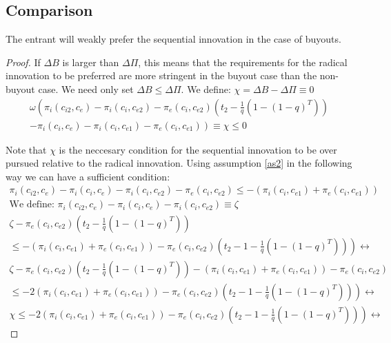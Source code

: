 \subsection{Comparison}  

\begin{proposition} \label{excessincentive}
The entrant will weakly prefer the sequential innovation in the case of buyouts.
\end{proposition}
\begin{proof}
If $\Delta B$ is larger than $\Delta \Pi$, this means that the requirements for the radical innovation to be preferred are more stringent in the buyout case than the non-buyout case.  We need only set $\Delta B \leq \Delta \Pi $. We define: $ \chi =\Delta B - \Delta \Pi \equiv 0$ 
\begin{align*}
\omega \left(  \pi_{i}(c_{i2},c_{e})- \pi_{i}(c_{i},c_{e2})-\pi_{e}(c_{i},c_{e2})  \left( t_2- \frac{1}{q} \left( 1-(1-q)^{T} \right) \right) \right. \\
-\left.\pi_i(c_i,c_{e})-\pi_i(c_i,c_{e1})-\pi_e(c_i,c_{e1}) \right) \equiv \chi \leq 0 
\end{align*}

Note that $\chi$ is the neccesary condition for the sequential innovation to be over pursued relative to the radical innovation. Using assumption \ref{as2} in the following way we can have a sufficient condition: 
\begin{align*}
\pi_{i}(c_{i2},c_{e})-\pi_i(c_i,c_{e})-\pi_{i}(c_{i},c_{e2})-\pi_{e}(c_{i},c_{e2}) \leq -(\pi_i(c_i,c_{e1})+\pi_e(c_i,c_{e1})) \\
\text{We define: } \pi_{i}(c_{i2},c_{e})-\pi_i(c_i,c_{e})-\pi_{i}(c_{i},c_{e2})  \equiv \zeta
\\
\zeta -\pi_{e}(c_{i},c_{e2}) \left( t_2- \frac{1}{q} \left( 1-(1-q)^{T} \right) \right) \\
\leq 
\left.-(\pi_i(c_i,c_{e1})+\pi_e(c_i,c_{e1})) -\pi_{e}(c_{i},c_{e2}) \left( t_2-1- \frac{1}{q} \left( 1-(1-q)^{T} \right) \right)\right) \leftrightarrow \\ 
\zeta -\pi_{e}(c_{i},c_{e2}) \left( t_2- \frac{1}{q} \left( 1-(1-q)^{T} \right) \right) -(\pi_i(c_i,c_{e1})+\pi_e(c_i,c_{e1})) -\pi_{e}(c_{i},c_{e2})\\
\leq 
\left. -2(\pi_i(c_i,c_{e1})+\pi_e(c_i,c_{e1})) -\pi_{e}(c_{i},c_{e2}) \left( t_2-1- \frac{1}{q} \left( 1-(1-q)^{T} \right) \right)\right) \leftrightarrow \\ 
\chi \leq 
\left. -2(\pi_i(c_i,c_{e1})+\pi_e(c_i,c_{e1})) -\pi_{e}(c_{i},c_{e2}) \left( t_2-1- \frac{1}{q} \left( 1-(1-q)^{T} \right) \right)\right) \leftrightarrow 
\end{align*}


\end{proof}
